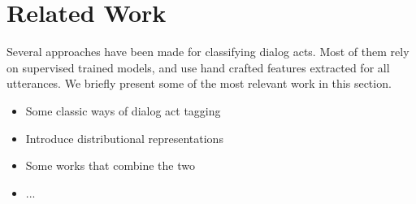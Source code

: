 \section{Related Work}\label{sec:relwork}
Several approaches have been made for classifying dialog acts. Most of them rely on supervised trained models, and use hand crafted features extracted for all utterances.  We briefly present some of the most relevant work in this section.
\begin{itemize}
	\item Some classic ways of dialog act tagging
	\item Introduce distributional representations
	\item Some works that combine the two
	\item ...
\end{itemize}